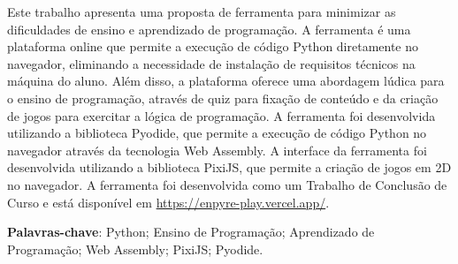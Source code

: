 \begin{resumo}
    Este trabalho apresenta uma proposta de ferramenta para minimizar as dificuldades de ensino e aprendizado de programação. A ferramenta é uma plataforma online que permite a execução de código Python diretamente no navegador, eliminando a necessidade de instalação de requisitos técnicos na máquina do aluno. Além disso, a plataforma oferece uma abordagem lúdica para o ensino de programação, através de quiz para fixação de conteúdo e da criação de jogos para exercitar a lógica de programação. A ferramenta foi desenvolvida utilizando a biblioteca Pyodide, que permite a execução de código Python no navegador através da tecnologia Web Assembly. A interface da ferramenta foi desenvolvida utilizando a biblioteca PixiJS, que permite a criação de jogos em 2D no navegador. A ferramenta foi desenvolvida como um Trabalho de Conclusão de Curso e está disponível em \url{https://enpyre-play.vercel.app/}.

 \vspace{\onelineskip}

 \noindent
 \textbf{Palavras-chave}:  Python; Ensino de Programação; Aprendizado de Programação; Web Assembly; PixiJS; Pyodide.
\end{resumo}
